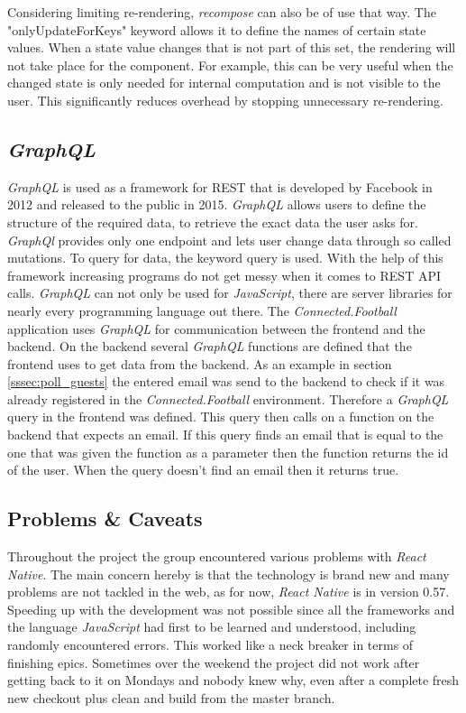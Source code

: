 \newline
Considering limiting re-rendering, \textit{recompose} can also be of use that way. The "onlyUpdateForKeys" keyword allows it to define the names of certain state values. When a state value changes that is not part of this set, the rendering will not take place for the component. For example, this can be very useful when the changed state is only needed for internal computation and is not visible to the user. This significantly reduces overhead by stopping unnecessary re-rendering.

\subsection{\textit{GraphQL}}
\label{ssec:graphql}

\textit{GraphQL} is used as a framework for REST that is developed by Facebook in 2012 and released to the public in 2015. \textit{GraphQL} allows users to define the structure of the required data, to retrieve the exact data the user asks for. \textit{GraphQl} provides only one endpoint and lets user change data through so called mutations. To query for data, the keyword query is used. With the help of this framework increasing programs do not get messy when it comes to REST API calls. \textit{GraphQL} can not only be used for \textit{JavaScript}, there are server libraries for nearly every programming language out there.
\newline
The \textit{Connected.Football} application uses \textit{GraphQL} for communication between the frontend and the backend. On the backend several \textit{GraphQL} functions are defined that the frontend uses to get data from the backend. As an example in section \ref{sssec:poll_guests} the entered email was send to the backend to check if it was already registered in the \textit{Connected.Football} environment. Therefore a \textit{GraphQL} query in the frontend was defined. This query then calls on a function on the backend that expects an email. If this query finds an email that is equal to the one that was given the function as a parameter then the function returns the id of the user. When the query doesn't find an email then it returns true. 


\subsection{Problems \& Caveats}
\label{ssec:problems}

Throughout the project the group encountered various problems with \textit{React Native}. The main concern hereby is that the technology is brand new and many problems are not tackled in the web, as for now, \textit{React Native} is in version 0.57. Speeding up with the development was not possible since all the frameworks and the language \textit{JavaScript} had first to be learned and understood, including randomly encountered errors. This worked like a neck breaker in terms of finishing epics. Sometimes over the weekend the project did not work after getting back to it on Mondays and nobody knew why, even after a complete fresh new checkout plus clean and build from the master branch.

